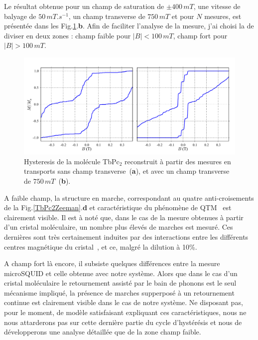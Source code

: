 Le résultat obtenue pour un champ de saturation de $\pm 400 \, mT$, une vitesse de balyage de $50\,mT.s^{-1}$, un champ transverse de $750\,mT$ et pour $N$ mesures, est présentée dans les Fig.\ref{CompAimant}.\textbf{b}. Afin de faciliter l'analyse de la mesure, j'ai choisi la de diviser en deux zones : champ faible pour $|B|< 100\,mT$, champ fort pour $|B|>100\,mT$.

\begin{figure}
\includegraphics[scale=0.45]{Resultats/CompCrisMolUnique/CompCrisMolUnique.pdf} 
\caption{Hysteresis de la molécule TbPc$_2$ reconstruit à partir des mesures en transports sans champ transverse~(\textbf{a}), et avec un champ transverse de $750\,mT$~(\textbf{b}).}
\label{CompAimant}
\end{figure}

A faible champ, la structure en marche, correspondant au quatre anti-croisements de la Fig.\ref{TbPc2Zeeman}.\textbf{d} et caractéristique du phénomène de QTM~\cite{Thomas1996,Friedman1996} est clairement visible. Il est à noté que, dans le cas de la mesure obtenues à partir d'un cristal moléculaire, un nombre plus élevés de marches est mesuré. Ces dernières sont très certainement induites par des interactions entre les différents centres magnétique du cristal~\cite{Wernsdorfer2002}, et ce, malgré la dilution à 10\%.

A champ fort là encore, il subsiste quelques différences entre la mesure microSQUID et celle obtenue avec notre système. Alors que dans le cas d'un cristal moléculaire le retournement assisté par le bain de phonons est le seul mécanisme impliqué, la présence  de marches supperposé à un retournement continue est clairement visible dans le cas de notre système. Ne disposant pas, pour le moment, de modèle satisfaisant expliquant ces caractéristiques, nous ne nous attarderons pas sur cette dernière partie du cycle d’hystérésis et nous de développerons une analyse détaillée que de la zone champ faible.

